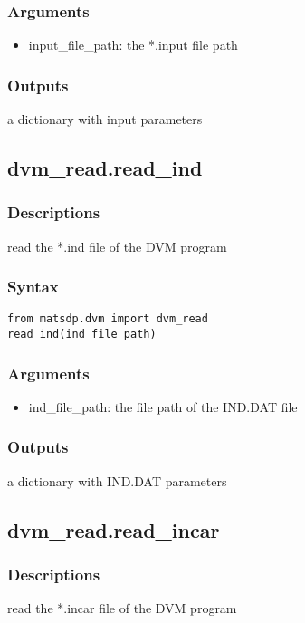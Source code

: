 \documentclass[12pt]{book}
\begin{document}
\subsubsection{Arguments}
\begin{itemize}
\item input\_file\_path: the *.input file path
\end{itemize}

\subsubsection{Outputs}
a dictionary with input parameters

\subsection{dvm\_read.read\_ind}

\subsubsection{Descriptions}
read the *.ind file of the DVM program
\subsubsection{Syntax}
\begin{lstlisting}
from matsdp.dvm import dvm_read
read_ind(ind_file_path)
\end{lstlisting}

\subsubsection{Arguments}
\begin{itemize}
\item ind\_file\_path: the file path of the IND.DAT file
\end{itemize}

\subsubsection{Outputs}
a dictionary with IND.DAT parameters


\subsection{dvm\_read.read\_incar}

\subsubsection{Descriptions}
read the *.incar file of the DVM program
\end{document}
